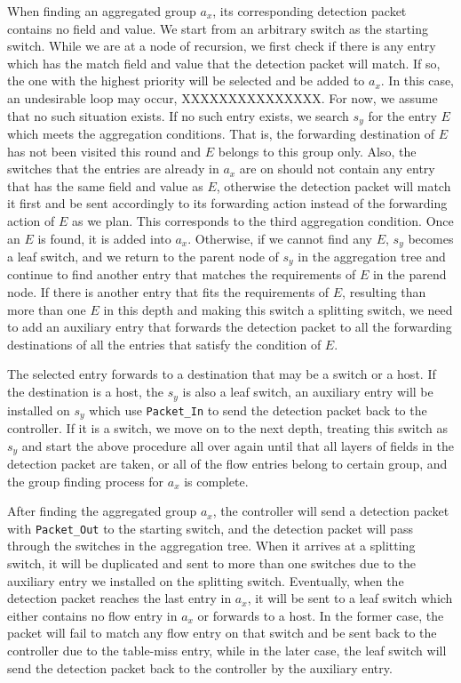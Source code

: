\documentclass[conference]{IEEEtran}
\begin{document}
When finding an aggregated group $a_x$, its corresponding detection packet contains no field and value. We start from an arbitrary switch as the starting switch. While we are at a node of recursion, we first check if there is any entry which has the match field and value that the detection packet will match. If so, the one with the highest priority will be selected and be added to $a_x$. In this case, an undesirable loop may occur, XXXXXXXXXXXXXXX. For now, we assume that no such situation exists. If no such entry exists, we search $s_y$ for the entry $E$ which meets the aggregation conditions. That is, the forwarding destination of $E$ has not been visited this round and $E$ belongs to this group only. Also, the switches that the entries are already in $a_x$ are on should not contain any entry that has the same field and value as $E$, otherwise the detection packet will match it first and be sent accordingly to its forwarding action instead of the forwarding action of $E$ as we plan. This corresponds to the third aggregation condition. Once an $E$ is found, it is added into $a_x$. Otherwise, if we cannot find any $E$, $s_y$ becomes a leaf switch, and we return to the parent node of $s_y$ in the aggregation tree and continue to find another entry that matches the requirements of $E$ in the parend node. If there is another entry that fits the requirements of $E$, resulting than more than one $E$ in this depth and making this switch a splitting switch, we need to add an auxiliary entry that forwards the detection packet to all the forwarding destinations of all the entries that satisfy the condition of $E$.

The selected entry forwards to a destination that may be a switch or a host. If the destination is a host, the $s_y$ is also a leaf switch, an auxiliary entry will be installed on $s_y$ which use \texttt{Packet\_In} to send the detection packet back to the controller. If it is a switch, we move on to the next depth, treating this switch as $s_y$ and start the above procedure all over again until that all layers of fields in the detection packet are taken, or all of the flow entries belong to certain group, and the group finding process for $a_x$ is complete.

After finding the aggregated group $a_x$, the controller will send a detection packet with \texttt{Packet\_Out} to the starting switch, and the detection packet will pass through the switches in the aggregation tree. When it arrives at a splitting switch, it will be duplicated and sent to more than one switches due to the auxiliary entry we installed on the splitting switch. Eventually, when the detection packet reaches the last entry in $a_x$, it will be sent to a leaf switch which either contains no flow entry in $a_x$ or forwards to a host. In the former case, the packet will fail to match any flow entry on that switch and be sent back to the controller due to the table-miss entry, while in the later case, the leaf switch will send the detection packet back to the controller by the auxiliary entry. 
\end{document}
